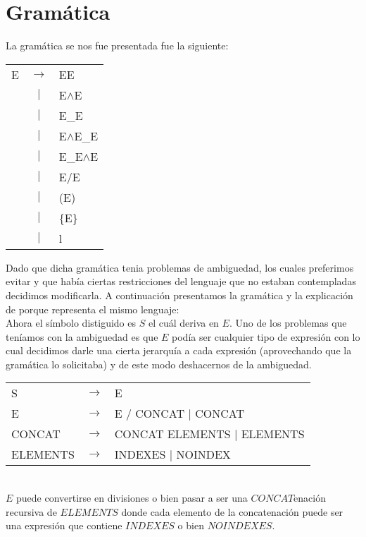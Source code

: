 \section{Gramática}
La gramática se nos fue presentada fue la siguiente:\\

\begin{tabular}{ l c l }
    E & $\rightarrow$ & EE \\
    & $|$ & E$\wedge$E \\
    & $|$ & E\_E \\
    & $|$ & E$\wedge$E\_E \\
    & $|$ & E\_E$\wedge$E \\
    & $|$ & E$\slash$E \\
    & $|$ & (E) \\
    & $|$ & \{E\} \\
    & $|$ & l \\
\end{tabular}

Dado que dicha gramática tenia problemas de ambiguedad, los cuales preferimos evitar y que había ciertas restricciones del lenguaje que no estaban contempladas decidimos modificarla.
A continuación presentamos la gramática y la explicación de porque representa el mismo lenguaje: \\

Ahora el símbolo distiguido es $S$ el cuál deriva en $E$. Uno de los problemas que teníamos con la ambiguedad es que $E$ podía
ser cualquier tipo de expresión con lo cual decidimos darle una cierta jerarquía a cada expresión (aprovechando que la gramática lo solicitaba) y de este modo
deshacernos de la ambiguedad.\\


\begin{tabular}{ l c l }
    S &        $\rightarrow$ & E \\
    E &        $\rightarrow$ & E $\slash$ CONCAT $|$ CONCAT \\
    CONCAT &   $\rightarrow$ & CONCAT ELEMENTS $|$ ELEMENTS \\
    ELEMENTS & $\rightarrow$ & INDEXES $|$ NOINDEX \\
\end{tabular} \\
$E$ puede convertirse en divisiones o bien pasar a ser una $CONCAT$enación recursiva de $ELEMENTS$ donde cada elemento de la concatenación
puede ser una expresión que contiene $INDEXES$ o bien $NOINDEXES$.\\

